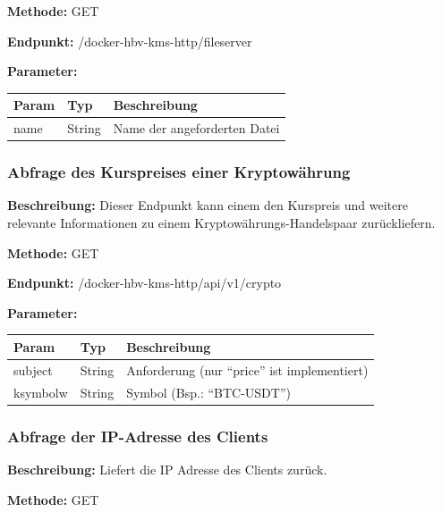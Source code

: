 \textbf{Methode:} GET

\textbf{Endpunkt:} /docker-hbv-kms-http/fileserver

\textbf{Parameter:}
\begin{table}[H]
    \label{table:/docker-hbv-kms-http/fileserver}
    \setlength{\tabcolsep}{3pt}
    \begin{tabular}{p{100pt}p{80pt}p{200pt}}
        \toprule
        Param & Typ    & Beschreibung                 \\
        \midrule
        name  & String & Name der angeforderten Datei \\
        \bottomrule
    \end{tabular}
\end{table}
\dotfill


\subsubsection{Abfrage des Kurspreises einer Kryptowährung}
\label{sec:api-crypto}
\textbf{Beschreibung:} Dieser Endpunkt kann einem den Kurspreis und weitere relevante Informationen zu einem Kryptowährungs-Handelspaar zurückliefern.

\textbf{Methode:} GET

\textbf{Endpunkt:} /docker-hbv-kms-http/api/v1/crypto

\textbf{Parameter:}
\begin{table}[H]
    \label{table:/docker-hbv-kms-http/api/v1/crypto}
    \setlength{\tabcolsep}{3pt}
    \begin{tabular}{p{100pt}p{80pt}p{200pt}}
        \toprule
        Param    & Typ    & Beschreibung                                  \\
        \midrule
        subject  & String & Anforderung (nur ``price'' ist implementiert) \\
        ksymbolw & String & Symbol (Bsp.: ``BTC-USDT'')                   \\
        \bottomrule
    \end{tabular}
\end{table}
\dotfill

\subsubsection{Abfrage der IP-Adresse des Clients}
\label{sec:api-client-ip}
\textbf{Beschreibung:} Liefert die IP Adresse des Clients zurück.

\textbf{Methode:} GET

